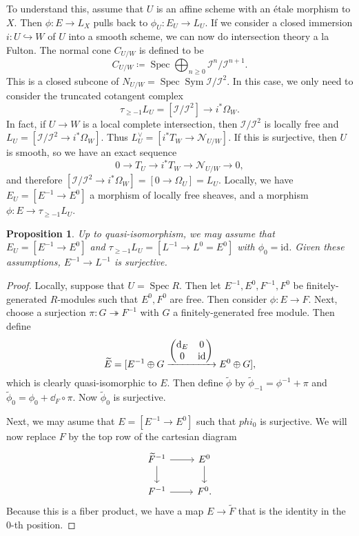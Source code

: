 \documentclass[leqno, openany]{memoir}
\newtheorem{prop}[thm]{Proposition}
\theoremstyle{definition}
\theoremstyle{remark}
\theoremstyle{plain}
\theoremstyle{definition}
\theoremstyle{remark}
\newcommand{\mc}[1]{\mathcal{#1}}
\newcommand{\mr}[1]{\mathrm{#1}}
\newcommand{\on}[1]{\operatorname{#1}}
\newcommand{\wt}[1]{\widetilde{#1}}
\DeclareMathOperator{\Spec}{Spec}
\begin{document}
To understand this, assume that $U$ is an affine scheme with an \'etale morphism to $X$. Then $\phi \colon E \to L_X$ pulls back to $\phi_U \colon E_U \to L_U$. If we consider a closed immersion $i \colon U \hookrightarrow W$ of $U$ into a smooth scheme, we can now do intersection theory a la Fulton. The normal cone $C_{U/W}$ is defined to be
\[ C_{U/W} \coloneqq \Spec \bigoplus_{n \geq 0} \mc{I}^n / \mc{I}^{n+1}. \]
This is a closed subcone of $N_{U/W} = \Spec \on{Sym} \mc{I}/\mc{I}^2$. In this case, we only need to consider the truncated cotangent complex
\[ \tau_{\geq -1} L_U = [\mc{I}/\mc{I}^2] \to i^* \Omega_W. \]
In fact, if $U \to W$ is a local complete intersection, then $\mc{I}/\mc{I}^2$ is locally free and $L_U = [\mc{I}/\mc{I}^2 \to i^* \Omega_W]$. Thus $L_U^{\vee} = [i^* T_W \to \mc{N}_{U/W}]$. If this is surjective, then $U$ is smooth, so we have an exact sequence
\[ 0 \to T_U \to i^* T_W \to \mc{N}_{U/W} \to 0, \]
and therefore $[\mc{I}/\mc{I}^2 \to i^* \Omega_W] = [0 \to \Omega_U] = L_U$. Locally, we have $E_U = [E^{-1} \to E^0]$ a morphism of locally free sheaves, and a morphism $\phi \colon E \to \tau_{\geq -1} L_U$.

\begin{prop}
    Up to quasi-isomorphism, we may assume that $E_U = [E^{-1} \to E^0]$ and $\tau_{\geq -1} L_U = [L^{-1} \to L^0 = E^0]$ with $\phi_0 = \mr{id}$. Given these assumptions, $E^{-1} \to L^{-1}$ is surjective.
\end{prop}

\begin{proof}
    Locally, suppose that $U = \Spec R$. Then let $E^{-1}, E^0, F^{-1}, F^0$ be finitely-generated $R$-modules such that $E^0, F^0$ are free. Then consider $\phi \colon E \to F$. Next, choose a surjection $\pi \colon G \twoheadrightarrow F^{-1}$ with $G$ a finitely-generated free module. Then define
    \[ \wt{E} = [E^{-1} \oplus G \xrightarrow{\mqty(\dd_E & 0 \\ 0 & \mr{id})} E^0 \oplus G], \]
    which is clearly quasi-isomorphic to $E$. Then define $\wt{\phi}$ by $\wt{\phi}_{-1} = \phi^{-1}+ \pi$ and $\wt{\phi}_0 = \phi_0 + \dd_F \circ \pi$. Now $\wt{\phi}_0$ is surjective.

    Next, we may asume that $E = [E^{-1} \to E^0]$ such that $phi_0$ is surjective. We will now replace $F$ by the top row of the cartesian diagram
    \begin{equation*}
    \begin{tikzcd}
        \wt{F}^{-1} \ar{d} \ar{r} & E^0 \ar{d} \\
        F^{-1} \ar{r} & F^0.
    \end{tikzcd}
    \end{equation*}
    Because this is a fiber product, we have a map $E \to \wt{F}$ that is the identity in the $0$-th position.
\end{proof}
\end{document}
